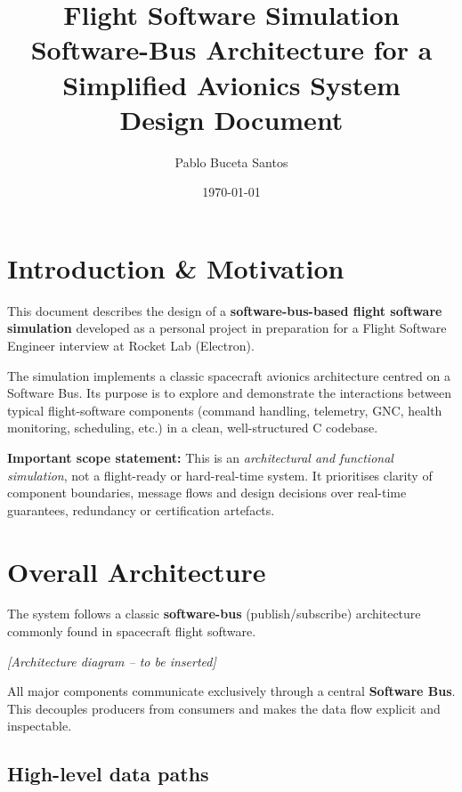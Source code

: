 \documentclass[11pt,a4paper]{article}
\title{%
    \vspace{-1cm}
    \textbf{Flight Software Simulation}\\[0.4em]
    \Large Software-Bus Architecture for a Simplified Avionics System\\[0.6em]
    \large Design Document
}
\author{Pablo Buceta Santos}
\date{\today}
\begin{document}
\maketitle
\tableofcontents
\newpage

\section{Introduction \& Motivation}

This document describes the design of a \textbf{software-bus-based flight software simulation} developed as a personal project in preparation for a Flight Software Engineer interview at Rocket Lab (Electron).

The simulation implements a classic spacecraft avionics architecture centred on a Software Bus. Its purpose is to explore and demonstrate the interactions between typical flight-software components (command handling, telemetry, GNC, health monitoring, scheduling, etc.) in a clean, well-structured C codebase.

\textbf{Important scope statement:}
This is an \emph{architectural and functional simulation}, not a flight-ready or hard-real-time system. It prioritises clarity of component boundaries, message flows and design decisions over real-time guarantees, redundancy or certification artefacts.

\section{Overall Architecture}

The system follows a classic \textbf{software-bus} (publish/subscribe) architecture commonly found in spacecraft flight software.

\begin{center}
\textit{[Architecture diagram -- to be inserted]}
\end{center}

All major components communicate exclusively through a central \textbf{Software Bus}. This decouples producers from consumers and makes the data flow explicit and inspectable.

\subsection{High-level data paths}
\end{document}
